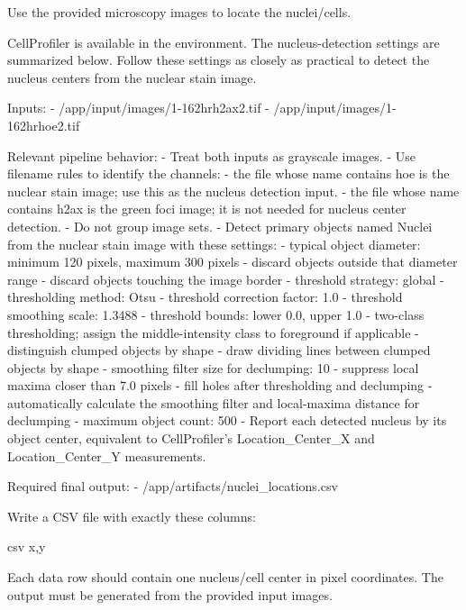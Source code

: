 \begin{instructionbox}
Use the provided microscopy images to locate the nuclei/cells.

CellProfiler is available in the environment. The nucleus-detection settings are summarized below. Follow these settings as closely as practical to detect the nucleus centers from the nuclear stain image.

Inputs:
- \textasciigrave{}/app/input/images/1-162hrh2ax2.tif\textasciigrave{}
- \textasciigrave{}/app/input/images/1-162hrhoe2.tif\textasciigrave{}

Relevant pipeline behavior:
- Treat both inputs as grayscale images.
- Use filename rules to identify the channels:
  - the file whose name contains \textasciigrave{}hoe\textasciigrave{} is the nuclear stain image; use this as the nucleus detection input.
  - the file whose name contains \textasciigrave{}h2ax\textasciigrave{} is the green foci image; it is not needed for nucleus center detection.
- Do not group image sets.
- Detect primary objects named \textasciigrave{}Nuclei\textasciigrave{} from the nuclear stain image with these settings:
  - typical object diameter: minimum \textasciigrave{}120\textasciigrave{} pixels, maximum \textasciigrave{}300\textasciigrave{} pixels
  - discard objects outside that diameter range
  - discard objects touching the image border
  - threshold strategy: global
  - thresholding method: Otsu
  - threshold correction factor: \textasciigrave{}1.0\textasciigrave{}
  - threshold smoothing scale: \textasciigrave{}1.3488\textasciigrave{}
  - threshold bounds: lower \textasciigrave{}0.0\textasciigrave{}, upper \textasciigrave{}1.0\textasciigrave{}
  - two-class thresholding; assign the middle-intensity class to foreground if applicable
  - distinguish clumped objects by shape
  - draw dividing lines between clumped objects by shape
  - smoothing filter size for declumping: \textasciigrave{}10\textasciigrave{}
  - suppress local maxima closer than \textasciigrave{}7.0\textasciigrave{} pixels
  - fill holes after thresholding and declumping
  - automatically calculate the smoothing filter and local-maxima distance for declumping
  - maximum object count: \textasciigrave{}500\textasciigrave{}
- Report each detected nucleus by its object center, equivalent to CellProfiler's \textasciigrave{}Location\_Center\_X\textasciigrave{} and \textasciigrave{}Location\_Center\_Y\textasciigrave{} measurements.

Required final output:
- \textasciigrave{}/app/artifacts/nuclei\_locations.csv\textasciigrave{}

Write a CSV file with exactly these columns:

\textasciigrave{}\textasciigrave{}\textasciigrave{}csv
x,y
\textasciigrave{}\textasciigrave{}\textasciigrave{}

Each data row should contain one nucleus/cell center in pixel coordinates. The output must be generated from the provided input images.
\end{instructionbox}


